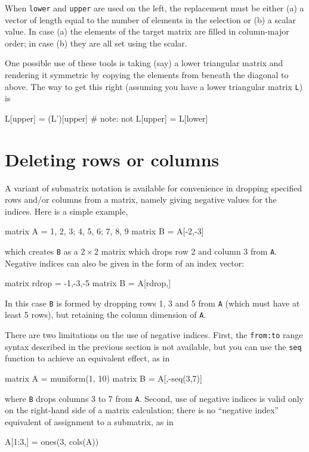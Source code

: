 When \texttt{lower} and \texttt{upper} are used on the left, the
replacement must be either (a) a vector of length equal to the number
of elements in the selection or (b) a scalar value. In case (a) the
elements of the target matrix are filled in column-major order; in
case (b) they are all set using the scalar.

One possible use of these tools is taking (say) a lower triangular
matrix and rendering it symmetric by copying the elements from beneath
the diagonal to above. The way to get this right (assuming you have a
lower triangular matrix \texttt{L}) is
\begin{code}
L[upper] = (L')[upper]  # note: not L[upper] = L[lower]
\end{code}

\section{Deleting rows or columns}
\label{sec:neg-indices}

A variant of submatrix notation is available for convenience in
dropping specified rows and/or columns from a matrix, namely giving
negative values for the indices. Here is a simple example,
%
\begin{code}
matrix A = {1, 2, 3; 4, 5, 6; 7, 8, 9}
matrix B = A[-2,-3]
\end{code}
%
which creates \texttt{B} as a $2\times 2$ matrix which drops row 2 and
column 3 from \texttt{A}. Negative indices can also be given in the
form of an index vector:
%
\begin{code}
matrix rdrop = {-1,-3,-5}
matrix B = A[rdrop,]
\end{code}
%
In this case \texttt{B} is formed by dropping rows 1, 3 and 5 from
\texttt{A} (which must have at least 5 rows), but retaining the column
dimension of \texttt{A}.

There are two limitations on the use of negative indices. First, the
\texttt{from:to} range syntax described in the previous section is not
available, but you can use the \texttt{seq} function to achieve an
equivalent effect, as in
%
\begin{code}
matrix A = muniform(1, 10)
matrix B = A[,-seq(3,7)]
\end{code}
%
where \texttt{B} drops columns 3 to 7 from \texttt{A}. Second, use of
negative indices is valid only on the right-hand side of a matrix
calculation; there is no ``negative index'' equivalent of assignment
to a submatrix, as in
%
\begin{code}
A[1:3,] = ones(3, cols(A))
\end{code}

